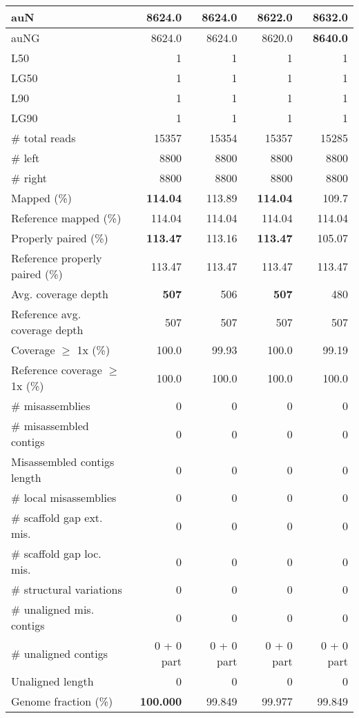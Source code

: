 \documentclass[12pt,a4paper]{article}
\begin{document}
\begin{table}[ht]
\begin{center}
\begin{tabular}{|l*{4}{|r}|}
auN & 8624.0 & 8624.0 & 8622.0 & {\bf 8632.0} \\ \hline
auNG & 8624.0 & 8624.0 & 8620.0 & {\bf 8640.0} \\ \hline
L50 & 1 & 1 & 1 & 1 \\ \hline
LG50 & 1 & 1 & 1 & 1 \\ \hline
L90 & 1 & 1 & 1 & 1 \\ \hline
LG90 & 1 & 1 & 1 & 1 \\ \hline
\# total reads & 15357 & 15354 & 15357 & 15285 \\ \hline
\# left & 8800 & 8800 & 8800 & 8800 \\ \hline
\# right & 8800 & 8800 & 8800 & 8800 \\ \hline
Mapped (\%) & {\bf 114.04} & 113.89 & {\bf 114.04} & 109.7 \\ \hline
Reference mapped (\%) & 114.04 & 114.04 & 114.04 & 114.04 \\ \hline
Properly paired (\%) & {\bf 113.47} & 113.16 & {\bf 113.47} & 105.07 \\ \hline
Reference properly paired (\%) & 113.47 & 113.47 & 113.47 & 113.47 \\ \hline
Avg. coverage depth & {\bf 507} & 506 & {\bf 507} & 480 \\ \hline
Reference avg. coverage depth & 507 & 507 & 507 & 507 \\ \hline
Coverage $\geq$ 1x (\%) & 100.0 & 99.93 & 100.0 & 99.19 \\ \hline
Reference coverage $\geq$ 1x (\%) & 100.0 & 100.0 & 100.0 & 100.0 \\ \hline
\# misassemblies & 0 & 0 & 0 & 0 \\ \hline
\# misassembled contigs & 0 & 0 & 0 & 0 \\ \hline
Misassembled contigs length & 0 & 0 & 0 & 0 \\ \hline
\# local misassemblies & 0 & 0 & 0 & 0 \\ \hline
\# scaffold gap ext. mis. & 0 & 0 & 0 & 0 \\ \hline
\# scaffold gap loc. mis. & 0 & 0 & 0 & 0 \\ \hline
\# structural variations & 0 & 0 & 0 & 0 \\ \hline
\# unaligned mis. contigs & 0 & 0 & 0 & 0 \\ \hline
\# unaligned contigs & 0 + 0 part & 0 + 0 part & 0 + 0 part & 0 + 0 part \\ \hline
Unaligned length & 0 & 0 & 0 & 0 \\ \hline
Genome fraction (\%) & {\bf 100.000} & 99.849 & 99.977 & 99.849 \\ \hline

\end{tabular}
\end{center}
\end{table}
\end{document}
